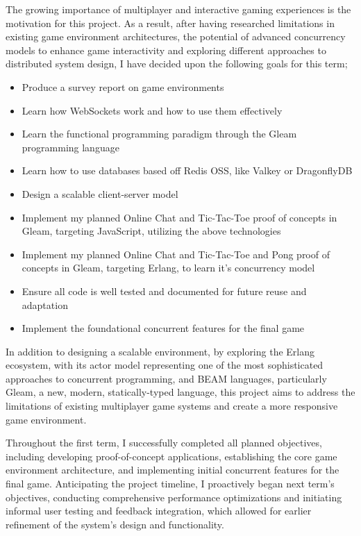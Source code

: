 \documentclass[]{project_interim}
\begin{document}
\newpage

The growing importance of multiplayer and interactive gaming experiences
is the motivation for this project. As a result, after having researched limitations
in existing game environment architectures, the potential of advanced
concurrency models to enhance game interactivity and exploring different
approaches to distributed system design, I have decided upon the following
goals for this term;

\begin{itemize}
  \item Produce a survey report on game environments
  \item Learn how WebSockets work and how to use them effectively
  \item Learn the functional programming paradigm through the Gleam programming language
  \item Learn how to use databases based off Redis OSS, like Valkey or DragonflyDB
  \item Design a scalable client-server model
  \item Implement my planned Online Chat and Tic-Tac-Toe proof of concepts in Gleam, targeting JavaScript, utilizing the above technologies
  \item Implement my planned Online Chat and Tic-Tac-Toe and Pong proof of concepts in Gleam, targeting Erlang, to learn it's concurrency model
  \item Ensure all code is well tested and documented for future reuse and adaptation
  \item Implement the foundational concurrent features for the final game
\end{itemize}

In addition to designing a scalable environment,
by exploring the Erlang ecosystem, with its actor model representing one of the
most sophisticated approaches to concurrent programming, and
BEAM languages, particularly Gleam, a new, modern, statically-typed language,
this project aims to address the limitations of existing multiplayer
game systems and create a more responsive game environment.

Throughout the first term, I successfully completed all planned objectives,
including developing proof-of-concept applications,
establishing the core game environment architecture, and implementing initial
concurrent features for the final game. Anticipating the project timeline,
I proactively began next term's objectives, conducting comprehensive performance
optimizations and initiating informal user testing and feedback integration,
which allowed for earlier refinement of the system's design and functionality.
\end{document}
